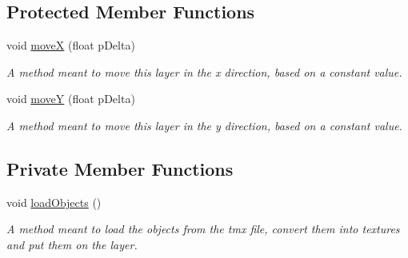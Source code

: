 \subsection*{Protected Member Functions}
\begin{DoxyCompactItemize}
\item 
void \hyperlink{classnl_1_1arjanfrans_1_1mario_1_1view_1_1ParallaxLayer_a12e98853c0a5eaadc896bc50c8bd84dc}{moveX} (float p\+Delta)
\begin{DoxyCompactList}\small\item\em A method meant to move this layer in the x direction, based on a constant value. \end{DoxyCompactList}\item 
void \hyperlink{classnl_1_1arjanfrans_1_1mario_1_1view_1_1ParallaxLayer_a961341849470a053f57c1a08000cdf69}{moveY} (float p\+Delta)
\begin{DoxyCompactList}\small\item\em A method meant to move this layer in the y direction, based on a constant value. \end{DoxyCompactList}\end{DoxyCompactItemize}
\subsection*{Private Member Functions}
\begin{DoxyCompactItemize}
\item 
\mbox{\label{classnl_1_1arjanfrans_1_1mario_1_1view_1_1ParallaxLayer_afbeccae3b9bf53a6ae696b185100e0b8}} 
void \hyperlink{classnl_1_1arjanfrans_1_1mario_1_1view_1_1ParallaxLayer_afbeccae3b9bf53a6ae696b185100e0b8}{load\+Objects} ()
\begin{DoxyCompactList}\small\item\em A method meant to load the objects from the tmx file, convert them into textures and put them on the layer. \end{DoxyCompactList}\end{DoxyCompactItemize}
